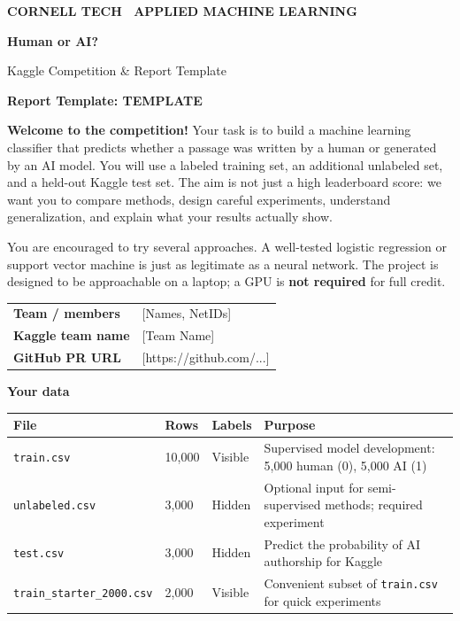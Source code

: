 \documentclass[11pt,letterpaper]{article}
\begin{document}
\thispagestyle{empty}

{\small\textbf{CORNELL TECH \textbar\ APPLIED MACHINE LEARNING}}
\vspace{4pt}

{\LARGE\textbf{Human or AI?}}
\vspace{2pt}

{\large Kaggle Competition \& Report Template}
\vspace{4pt}

\textbf{Report Template: TEMPLATE}
\vspace{10pt}

\textbf{Welcome to the competition!} Your task is to build a machine learning classifier that predicts whether a passage was written by a human or generated by an AI model. You will use a labeled training set, an additional unlabeled set, and a held-out Kaggle test set. The aim is not just a high leaderboard score: we want you to compare methods, design careful experiments, understand generalization, and explain what your results actually show.

You are encouraged to try several approaches. A well-tested logistic regression or support vector machine is just as legitimate as a neural network. The project is designed to be approachable on a laptop; a GPU is \textbf{not required} for full credit.

\vspace{8pt}
\begin{tabular}{@{}ll@{}}
\textbf{Team / members} & [Names, NetIDs] \\[3pt]
\textbf{Kaggle team name} & [Team Name] \\[3pt]
\textbf{GitHub PR URL} & [https://github.com/...] \\
\end{tabular}

\vspace{10pt}
{\large\textbf{Your data}}
\vspace{4pt}

\begin{tabularx}{\textwidth}{@{}llp{1.8cm}X@{}}
\toprule
\textbf{File} & \textbf{Rows} & \textbf{Labels} & \textbf{Purpose} \\
\midrule
\texttt{train.csv} & 10,000 & Visible & Supervised model development: 5,000 human (0), 5,000 AI (1) \\
\texttt{unlabeled.csv} & 3,000 & Hidden & Optional input for semi-supervised methods; required experiment \\
\texttt{test.csv} & 3,000 & Hidden & Predict the probability of AI authorship for Kaggle \\
\texttt{train\_starter\_2000.csv} & 2,000 & Visible & Convenient subset of \texttt{train.csv} for quick experiments \\
\bottomrule
\end{tabularx}
\end{document}
